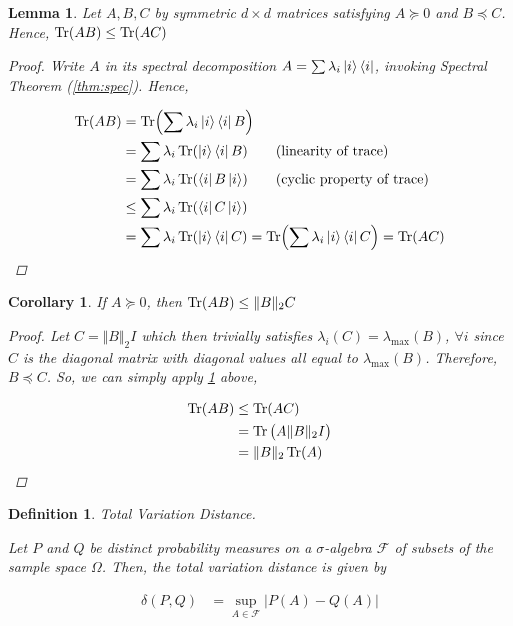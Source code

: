 \documentclass[11pt]{article}
\newcommand\0{\mathbf{0}}
\newcommand\<{\langle}
\renewcommand\>{\rangle}
\newtheorem{corollary}{Corollary}[theorem]
\newtheorem{lemma}[theorem]{Lemma}
\newtheorem{definition}[theorem]{Definition}
\begin{document}
\begin{lemma}
\label{lem:psd-trace}
Let $A, B, C$ by symmetric $d \times d$ matrices satisfying $A \succeq 0$ and $B \preceq C$. Hence, $\Tr(AB) \leq \Tr(AC)$

\begin{proof}
	Write $A$ in its spectral decomposition $A = \sum \lambda_i \ket{i}\bra{i}$, invoking Spectral Theorem (\ref{thm:spec}). Hence,
	
	\begin{align*}
		\Tr(AB) &= \Tr(\sum \lambda_i \ket{i}\bra{i} B)\\
		&= \sum \lambda_i \Tr(\ket{i}\bra{i} B) \tag{linearity of trace}\\
		&= \sum \lambda_i \Tr(\bra{i} B \ket{i}) \tag{cyclic property of trace}\\
		&\leq \sum \lambda_i \Tr(\bra{i} C \ket{i})\\
		&= \sum \lambda_i \Tr(\ket{i}\bra{i} C) = \Tr(\sum \lambda_i \ket{i}\bra{i} C) = \Tr(AC)
	\end{align*}
\end{proof}
\end{lemma}

\begin{corollary}
\label{cor:psd-tr-norm-ineq}
If $A \succeq 0$, then $\Tr(AB) \leq \Vert B \Vert_2 C$

\begin{proof}
Let $C = \Vert B \Vert_2 I$ which then trivially satisfies $\lambda_i(C) = \lambda_{\max}(B)$, $\forall i$ since $C$ is the diagonal matrix with diagonal values all equal to $\lambda_{\max}(B)$. Therefore, $B \preceq C$. So, we can simply apply \ref{lem:psd-trace} above,

\begin{align*}
\Tr(AB) &\leq \Tr(AC) \\
&= \Tr\big(A \Vert B \Vert_2 I\big)\\
&= \Vert B \Vert_2 \Tr(A)
\end{align*}
\end{proof}
\end{corollary}



\begin{definition} Total Variation Distance.
\label{def:tve}

Let $P$ and $Q$ be distinct probability measures on a $\sigma$-algebra $\mathcal{F}$ of subsets of the sample space $\Omega$. Then, the total variation distance is given by

\begin{align*}
\delta(P, Q) &= \sup_{A \in \mathcal{F}}\vert P(A) - Q(A)\vert
\end{align*}
\end{definition}
\end{document}
